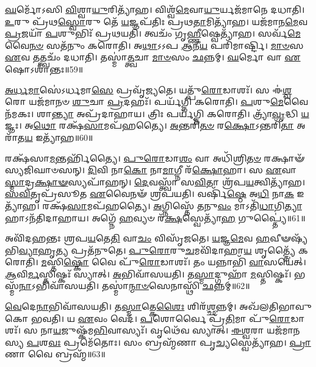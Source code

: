 \-\ul{𑌘}\-𑌰𑍍𑌮𑍋᳴𑌽𑌸𑌿 \ul{𑌵𑌿}\-𑌶𑍍𑌵𑌾\-\ul{𑌯𑍁}\-𑌰𑌿𑌤𑍍𑌯𑌾᳴𑌹।
𑌵𑌿𑌶𑍍𑌵᳴\-\ul{𑌮𑍇}\-𑌵𑌾\-\ul{𑌯𑍁}\-𑌰𑍍𑌯𑌜᳴𑌮𑌾𑌨𑍇 𑌦𑌧𑌾𑌤𑌿।
\-\ul{𑌉}\-𑌰𑍁 𑌪𑍍𑌰᳴𑌥\-\ul{𑌸𑍍𑌵𑍋}\-𑌰𑍁 𑌤𑍇᳴ \ul{𑌯}\-𑌜𑍍𑌞𑌪᳴𑌤𑌿𑌃 𑌪𑍍𑌰𑌥\-\ul{𑌤𑌾}\-𑌮𑌿𑌤𑍍𑌯𑌾᳴𑌹।
𑌯𑌜᳴𑌮𑌾𑌨\-\ul{𑌮𑍇}\-𑌵 \ul{𑌪𑍍𑌰}\-𑌜𑌯𑌾᳴ \ul{𑌪}\-𑌶𑍁𑌭𑌿𑌃᳴ 𑌪𑍍𑌰𑌥𑌯𑌤𑌿।
𑌤𑍍𑌵𑌚𑌂᳴ 𑌗𑍃\-\ul{𑌹𑍍𑌣𑍀}\-𑌷𑍍𑌵𑍇𑌤𑍍𑌯𑌾᳴𑌹।
𑌸𑌰𑍍𑌵᳴\-\ul{𑌮𑍇}\-𑌵𑍈\-\ul{𑌨}\-\-\ul{𑍞} 𑌸𑌤᳴𑌨𑍁𑌂 𑌕𑌰𑍋𑌤𑌿।
𑌅\-\ul{𑌥𑌾}\-𑌽𑌽𑌪 \ul{𑌆}\-𑌨𑍀\-\ul{𑌯} 𑌪𑌰𑌿᳴𑌮𑌾𑌰𑍍𑌷𑍍𑌟𑌿।
\-\ul{𑌮𑌾}\-\-\ul{𑍞}\-𑌸 \ul{𑌏}\-𑌵 𑌤𑌤𑍍𑌤𑍍𑌵𑌚𑌂᳴ 𑌦𑌧𑌾𑌤𑌿।
𑌤𑌸𑍍𑌮𑌾॑\-\ul{𑌤𑍍𑌤𑍍𑌵}\-𑌚𑌾 \ul{𑌮𑌾}\-\-\ul{𑍞}\-𑌸𑌂 \ul{𑌛}\-𑌨𑍍𑌨𑌮𑍍।
\-\ul{𑌘}\-𑌰𑍍𑌮𑍋 𑌵𑌾 \ul{𑌏}\-𑌷𑍋\-𑌽𑌶𑌾॑𑌨𑍍𑌤𑌃॥59॥

\-\ul{𑌅}\-\-\ul{𑌰𑍍𑌧}\-\-\ul{𑌮𑌾}\-𑌸𑍇॑\-𑌽𑌰𑍍𑌧𑌮𑌾\-\ul{𑌸𑍇} 𑌪𑍍𑌰𑌵𑍃᳴𑌜𑍍𑌯𑌤𑍇।
𑌯𑌤𑍍𑌪𑍁᳴\-\ul{𑌰𑍋}\-𑌡𑌾𑌶𑌃᳴।
𑌸 𑌈॑\-\ul{𑌶𑍍𑌵}\-𑌰𑍋 𑌯𑌜᳴𑌮𑌾𑌨𑍞 \ul{𑌶𑍁}\-𑌚𑌾 \ul{𑌪𑍍𑌰}\-𑌦𑌹𑌃᳴।
𑌪𑌰𑍍𑌯᳴𑌗𑍍𑌨𑌿 𑌕𑌰𑍋𑌤𑌿।
\-\ul{𑌪}\-𑌶𑍁\-\ul{𑌮𑍇}\-𑌵𑍈𑌨᳴𑌮𑌕𑌃।
𑌶𑌾\-\ul{𑌨𑍍𑌤𑍍𑌯𑌾} 𑌅𑌪𑍍𑌰᳴𑌦𑌾𑌹𑌾𑌯।
𑌤𑍍𑌰𑌿𑌃 𑌪𑌰𑍍𑌯᳴𑌗𑍍𑌨𑌿 𑌕𑌰𑍋𑌤𑌿।
𑌤𑍍𑌰𑍍𑌯𑌾᳴\-\ul{𑌵𑍃}\-𑌦𑍍𑌧𑌿 \ul{𑌯}\-𑌜𑍍𑌞𑌃।
𑌅\-\ul{𑌥𑍋} 𑌰𑌕𑍍𑌷᳴\-\ul{𑌸𑌾}\-𑌮𑌪᳴𑌹𑌤𑍍𑌯𑍈।
\-\ul{𑌅}\-𑌨𑍍𑌤𑌰𑌿᳴\-\ul{𑌤}\-\-\ul{𑍞} 𑌰\-\ul{𑌕𑍍𑌷𑍋}\-\-𑌽𑌨𑍍𑌤𑌰𑌿᳴\-\ul{𑌤𑌾} 𑌅𑌰𑌾᳴𑌤\-\ul{𑌯} 𑌇𑌤𑍍𑌯𑌾᳴𑌹॥60॥

𑌰𑌕𑍍𑌷᳴𑌸𑌾\-\ul{𑌮}\-𑌨𑍍𑌤𑌰𑍍\mbox{}𑌹𑌿᳴𑌤𑍍𑌯𑍈।
\-\ul{𑌪𑍁}\-\-\ul{𑌰𑍋}\-𑌡𑌾\-\ul{𑌶𑌂} 𑌵𑌾 𑌅𑌧𑌿᳴𑌶𑍍𑌰𑌿\-\ul{𑌤}\-\-\ul{𑍞} 𑌰𑌕𑍍𑌷𑌾𑍟᳴𑌸𑍍𑌯\-𑌜𑌿𑌘𑌾𑍞𑌸𑌨𑍍।
\-\ul{𑌦𑌿}\-𑌵𑌿 𑌨𑌾\-\ul{𑌕𑍋} 𑌨𑌾\-\ul{𑌮𑌾}\-𑌗𑍍𑌨𑍀 𑌰᳴\-\ul{𑌕𑍍𑌷𑍋}\-𑌹𑌾।
𑌸 \ul{𑌏}\-𑌵𑌾\-\ul{𑌸𑍍𑌮𑌾}\-𑌦𑍍𑌰\-\ul{𑌕𑍍𑌷𑌾}\-\-\ul{𑍟}\-\-𑌸𑍍𑌯𑌪𑌾᳴\-𑌹𑌨𑍍।
\-\ul{𑌦𑍇}\-𑌵𑌸𑍍𑌤𑍍𑌵𑌾᳴ 𑌸\-\ul{𑌵𑌿}\-𑌤𑌾 𑌶𑍍𑌰᳴𑌪\-\ul{𑌯}\-𑌤𑍍𑌵𑌿𑌤𑍍𑌯𑌾᳴𑌹।
\-\ul{𑌸}\-\-\ul{𑌵𑌿}\-𑌤𑍃𑌪𑍍𑌰᳴𑌸𑍂𑌤 \ul{𑌏}\-𑌵𑍈𑌨𑍟᳴ 𑌶𑍍𑌰𑌪𑌯𑌤𑌿।
𑌵𑌰𑍍\mbox{}𑌷𑌿᳴\-\ul{𑌷𑍍𑌠𑍇} 𑌅\-\ul{𑌧𑌿} 𑌨𑌾\-\ul{𑌕} 𑌇𑌤𑍍𑌯𑌾᳴𑌹।
𑌰𑌕𑍍𑌷᳴\-\ul{𑌸𑌾}\-𑌮𑌪᳴𑌹𑌤𑍍𑌯𑍈।
\-\ul{𑌅}\-𑌗𑍍𑌨𑌿𑌸𑍍𑌤𑍇᳴ \ul{𑌤}\-𑌨𑍁\-\ul{𑌵𑌂} 𑌮𑌾𑌽𑌤𑌿᳴\-\ul{𑌧𑌾}\-𑌗𑌿\-\ul{𑌤𑍍𑌯𑌾}\-𑌹𑌾\-𑌽𑌨᳴𑌤𑌿𑌦𑌾𑌹𑌾𑌯।
𑌅𑌗𑍍𑌨𑍇᳴ \ul{𑌹}\-𑌵𑍍𑌯𑍞 𑌰᳴\-\ul{𑌕𑍍𑌷}\-𑌸𑍍𑌵𑍇𑌤𑍍𑌯𑌾᳴\-\ul{𑌹} 𑌗𑍁𑌪𑍍𑌤𑍍𑌯𑍈॑॥61॥

𑌅𑌵𑌿᳴𑌦𑌹𑌨𑍍𑌤𑌃 𑌶𑍍𑌰𑌪\-\ul{𑌯}\-𑌤𑍇\-\ul{𑌤𑌿} 𑌵𑌾\-\ul{𑌚𑌂} 𑌵𑌿𑌸𑍃᳴𑌜𑌤𑍇।
\-\ul{𑌯}\-𑌜𑍍𑌞\-\ul{𑌮𑍇}\-𑌵 \ul{𑌹}\-𑌵𑍀𑍟𑌷𑍍𑌯᳴𑌭𑌿\-\ul{𑌵𑍍𑌯𑌾}\-𑌹𑍃\-\ul{𑌤𑍍𑌯} 𑌪𑍍𑌰𑌤᳴𑌨𑍁𑌤𑍇।
\-\ul{𑌪𑍁}\-\-\ul{𑌰𑍋}\-𑌰𑍁\-\ul{𑌚}\-𑌮𑌵𑌿᳴𑌦𑌾𑌹𑌾\-\ul{𑌯} 𑌶𑍃𑌤𑍍𑌤𑍍𑌯𑍈᳴ 𑌕𑌰𑍋𑌤𑌿।
\-\ul{𑌮}\-𑌸𑍍𑌤𑌿\-\ul{𑌷𑍍𑌕𑍋} 𑌵𑍈 𑌪𑍁᳴\-\ul{𑌰𑍋}\-𑌡𑌾𑌶𑌃᳴।
𑌤𑌂 𑌯𑌨𑍍𑌨𑌾𑌭𑌿᳴ \ul{𑌵𑌾}\-𑌸𑌯𑍇॑𑌤𑍍।
\-\ul{𑌆}\-𑌵𑌿\-\ul{𑌰𑍍𑌮}\-𑌸𑍍𑌤𑌿𑌷𑍍𑌕𑌃᳴ 𑌸𑍍𑌯𑌾𑌤𑍍।
\-\ul{𑌅}\-𑌭𑌿𑌵𑌾᳴𑌸𑌯𑌤𑌿।
𑌤\-\ul{𑌸𑍍𑌮𑌾}\-𑌦𑍍𑌗𑍁𑌹𑌾᳴ \ul{𑌮}\-𑌸𑍍𑌤𑌿𑌷𑍍𑌕𑌃᳴।
𑌭𑌸𑍍𑌮᳴\-\ul{𑌨𑌾}\-\-𑌽𑌭𑌿𑌵𑌾᳴𑌸𑌯𑌤𑌿।
𑌤𑌸𑍍𑌮𑌾॑\-\ul{𑌨𑍍𑌮𑌾}\-\-\ul{𑍞}\-𑌸𑍇𑌨𑌾𑌸𑍍𑌥𑌿᳴ \ul{𑌛}\-𑌨𑍍𑌨𑌮𑍍॥62॥

\-\ul{𑌵𑍇}\-𑌦𑍇\-\ul{𑌨𑌾}\-𑌭𑌿𑌵𑌾᳴𑌸𑌯𑌤𑌿।
𑌤\-\ul{𑌸𑍍𑌮𑌾}\-𑌤𑍍𑌕𑍇\-\ul{𑌶𑍈𑌃} 𑌶𑌿𑌰᳴\-\ul{𑌶𑍍𑌛}\-𑌨𑍍𑌨𑌮𑍍।
𑌅𑌖᳴𑌲𑌤𑌿\-𑌭𑌾𑌵𑍁𑌕𑍋 𑌭𑌵𑌤𑌿।
𑌯 \ul{𑌏}\-𑌵𑌂 𑌵𑍇𑌦᳴।
\-\ul{𑌪}\-𑌶𑍋𑌰𑍍𑌵𑍈 𑌪𑍍𑌰᳴\-\ul{𑌤𑌿}\-𑌮𑌾 𑌪𑍁᳴\-\ul{𑌰𑍋}\-𑌡𑌾𑌶𑌃᳴।
𑌸 𑌨𑌾\-\ul{𑌯}\-𑌜𑍁𑌷𑍍𑌕᳴𑌮\-\ul{𑌭𑌿}\-𑌵𑌾𑌸𑍍𑌯𑌃᳴।
𑌵𑍃𑌥𑍇᳴𑌵 𑌸𑍍𑌯𑌾𑌤𑍍।
\-\ul{𑌈}\-\-\ul{𑌶𑍍𑌵}\-𑌰𑌾 𑌯𑌜᳴𑌮𑌾𑌨𑌸𑍍𑌯 \ul{𑌪}\-𑌶\-\ul{𑌵𑌃} 𑌪𑍍𑌰𑌮𑍇᳴𑌤𑍋𑌃।
𑌸𑌂 𑌬𑍍𑌰𑌹𑍍𑌮᳴𑌣𑌾 𑌪𑍃\-\ul{𑌚𑍍𑌯}\-𑌸𑍍𑌵𑍇𑌤𑍍𑌯𑌾᳴𑌹।
\-\ul{𑌪𑍍𑌰𑌾}\-𑌣𑌾 𑌵𑍈 𑌬𑍍𑌰𑌹𑍍𑌮᳴॥63॥

